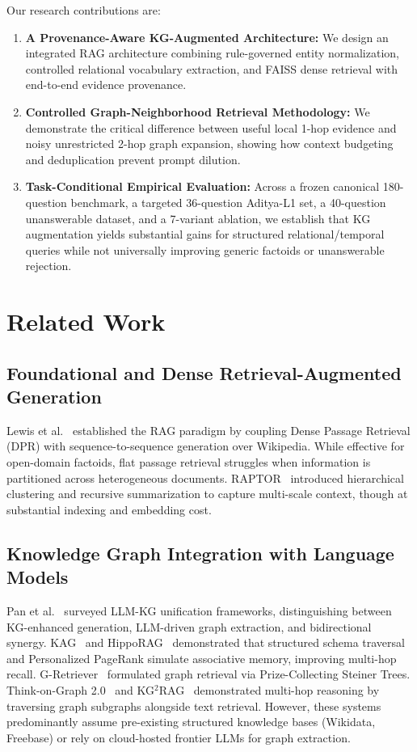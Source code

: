 \documentclass[conference]{IEEEtran}
\begin{document}
Our research contributions are:
\begin{enumerate}
    \item \textbf{A Provenance-Aware KG-Augmented Architecture:} We design an integrated RAG architecture combining rule-governed entity normalization, controlled relational vocabulary extraction, and FAISS dense retrieval with end-to-end evidence provenance.
    \item \textbf{Controlled Graph-Neighborhood Retrieval Methodology:} We demonstrate the critical difference between useful local 1-hop evidence and noisy unrestricted 2-hop graph expansion, showing how context budgeting and deduplication prevent prompt dilution.
    \item \textbf{Task-Conditional Empirical Evaluation:} Across a frozen canonical 180-question benchmark, a targeted 36-question Aditya-L1 set, a 40-question unanswerable dataset, and a 7-variant ablation, we establish that KG augmentation yields substantial gains for structured relational/temporal queries while not universally improving generic factoids or unanswerable rejection.
\end{enumerate}

\section{Related Work}
\label{sec:related}

\subsection{Foundational and Dense Retrieval-Augmented Generation}
Lewis et al.~\cite{lewis2020rag} established the RAG paradigm by coupling Dense Passage Retrieval (DPR) with sequence-to-sequence generation over Wikipedia. While effective for open-domain factoids, flat passage retrieval struggles when information is partitioned across heterogeneous documents. RAPTOR~\cite{sarthi2024raptor} introduced hierarchical clustering and recursive summarization to capture multi-scale context, though at substantial indexing and embedding cost.

\subsection{Knowledge Graph Integration with Language Models}
Pan et al.~\cite{pan2024unifying} surveyed LLM-KG unification frameworks, distinguishing between KG-enhanced generation, LLM-driven graph extraction, and bidirectional synergy. KAG~\cite{liang2024kag} and HippoRAG~\cite{gutierrez2024hipporag} demonstrated that structured schema traversal and Personalized PageRank simulate associative memory, improving multi-hop recall. G-Retriever~\cite{he2024gretriever} formulated graph retrieval via Prize-Collecting Steiner Trees. Think-on-Graph 2.0~\cite{ma2024tog2} and KG$^2$RAG~\cite{zhang2025kg2rag} demonstrated multi-hop reasoning by traversing graph subgraphs alongside text retrieval. However, these systems predominantly assume pre-existing structured knowledge bases (Wikidata, Freebase) or rely on cloud-hosted frontier LLMs for graph extraction.
\end{document}
